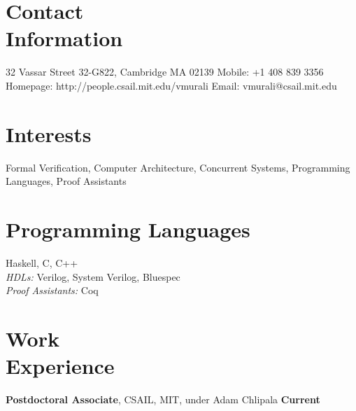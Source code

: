 \documentclass[margin]{resume}
\begin{document}
\begin{resume}

    \section{\mysidestyle Contact\\Information}

    32 Vassar Street 32-G822, Cambridge MA 02139   \hfill Mobile: +1 408 839 3356          \\
    Homepage: http://people.csail.mit.edu/vmurali     \hfill Email: vmurali@csail.mit.edu    \\

    \vspace{-5mm}
    \section{\mysidestyle Interests}

    Formal Verification, Computer Architecture, Concurrent Systems, Programming Languages, Proof Assistants\\

    \vspace{-5mm}

    \section{\mysidestyle Programming Languages}
    Haskell, C, C++\\
    \emph{HDLs:} Verilog, System Verilog, Bluespec\\
    \emph{Proof Assistants:} Coq\\

    \vspace{-5mm}
    \section{\mysidestyle Work\\Experience}
   
    \textbf{Postdoctoral Associate}, CSAIL, MIT, under Adam Chlipala \hfill \textbf{Current}\\


\end{resume}
\end{document}

